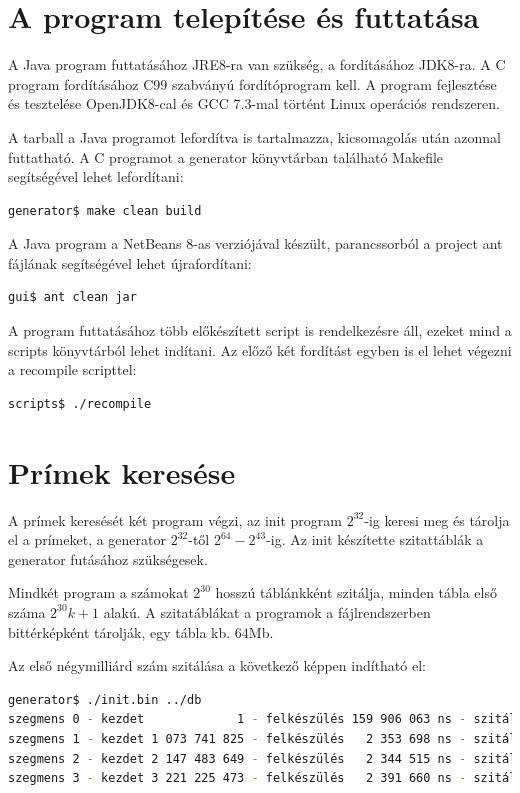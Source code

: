 \documentclass[12pt]{report}
\begin{document}
\section{A program telepítése és futtatása}

A Java program futtatásához JRE8-ra van szükség,
a fordításához JDK8-ra. A C program fordításához C99
szabványú fordítóprogram kell. A program fejlesztése
és tesztelése OpenJDK8-cal és GCC 7.3-mal történt
Linux operációs rendszeren.

A tarball a Java programot lefordítva is tartalmazza,
kicsomagolás után azonnal futtatható.
A C programot a generator könyvtárban található Makefile segítségével lehet lefordítani:
\begin{lstlisting}[language=bash]
generator$ make clean build
\end{lstlisting}

A Java program a NetBeans 8-as verziójával készült,
parancssorból a project ant fájlának segítségével lehet
újrafordítani:
\begin{lstlisting}[language=bash]
gui$ ant clean jar
\end{lstlisting}

A program futtatásához több előkészített script is rendelkezésre áll,
ezeket mind a scripts könyvtárból lehet indítani.
Az előző két fordítást egyben is el lehet végezni a recompile scripttel:
\begin{lstlisting}[language=bash]
scripts$ ./recompile
\end{lstlisting}

\section{Prímek keresése}

A prímek keresését két program végzi, az init program
$2^{32}$-ig keresi meg és tárolja el a prímeket,
a generator $2^{32}$-től $2^{64}-2^{43}$-ig.
Az init készítette szitattáblák a generator futásához szükségesek.

Mindkét program a számokat $2^{30}$ hosszú táblánkként szitálja,
minden tábla első száma $2^{30}k+1$ alakú. A szitatáblákat a programok a
fájlrendszerben bittérképként tárolják, egy tábla kb. $64$Mb.

Az első négymilliárd szám szitálása a következő képpen indítható el:

\tiny
\begin{lstlisting}[language=bash]
generator$ ./init.bin ../db
szegmens 0 - kezdet             1 - felkészülés 159 906 063 ns - szitálás 1 122 878 403 ns
szegmens 1 - kezdet 1 073 741 825 - felkészülés   2 353 698 ns - szitálás 1 171 101 336 ns
szegmens 2 - kezdet 2 147 483 649 - felkészülés   2 344 515 ns - szitálás 1 188 330 478 ns
szegmens 3 - kezdet 3 221 225 473 - felkészülés   2 391 660 ns - szitálás 1 199 900 603 ns
\end{lstlisting}
\small
\end{document}
